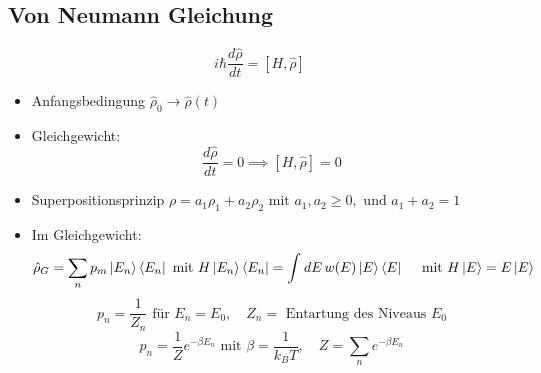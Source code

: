\documentclass[11pt]{article}
\theoremstyle{plain}
\begin{document}
\subsection*{Von Neumann Gleichung}
\[ i \hbar \frac{d\hat{\rho}}{dt} = \left[ H, \hat{\rho} \right] \] 
\begin{itemize}
  \item Anfangsbedingung $\hat{\rho}_0 \to  \hat{\rho}(t)$
  \item Gleichgewicht: \[ \frac{d \hat{\rho}}{dt}=0 \implies  \left[ H, \hat{\rho} \right]=0  \] 
  \item Superpositionsprinzip $\rho= a_1 \rho_1 + a_2 \rho_2 \text{ mit } a_1, a_2 \ge 0,
    \text{ und } a_1+a_2 =1 $
  \item Im Gleichgewicht: \[ \hat{\rho}_G = \sum_{n}^{} p_m \Ket{E_n}\Bra{E_n} \text{ mit }
      H \Ket{E_n}\Bra{E_n} = \int_{}^{} dE\, w(E)\Ket{E}\Bra{E} \quad \text{ mit }
    H \Ket{E}= E \Ket{E}\] 
    \[ p_n = \frac{1}{Z_n} \text{ f\"ur } E_n = E_0, \quad Z_n= \text{ Entartung des Niveaus } E_0 \] 
    \[ p_n = \frac{1}{Z} e^{-\beta E_n} \text{ mit } 
    \beta= \frac{1}{k_B T}, \quad Z=\sum_{n}^{} e^{-\beta E_n} \] 
\end{itemize}
\end{document}

